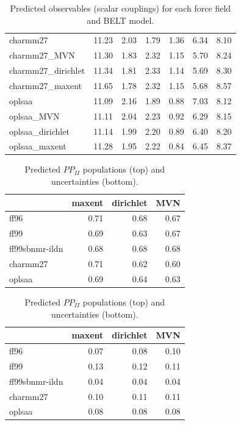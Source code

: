 \documentclass[12pt]{article}
\begin{document}
\begin{table}
\begin{tabular}{lrrrrrr}
\toprule
charmm27                    &    11.23 &          2.03 &      1.79 &          1.36 &      6.34 &     8.10 \\
charmm27\_MVN                &    11.30 &          1.83 &      2.32 &          1.15 &      5.70 &     8.24 \\
charmm27\_dirichlet          &    11.34 &          1.81 &      2.33 &          1.14 &      5.69 &     8.30 \\
charmm27\_maxent             &    11.65 &          1.78 &      2.32 &          1.15 &      5.68 &     8.57 \\
\toprule
oplsaa                      &    11.09 &          2.16 &      1.89 &          0.88 &      7.03 &     8.12 \\
oplsaa\_MVN                  &    11.11 &          2.04 &      2.23 &          0.92 &      6.29 &     8.15 \\
oplsaa\_dirichlet            &    11.14 &          1.99 &      2.20 &          0.89 &      6.40 &     8.20 \\
oplsaa\_maxent               &    11.28 &          1.95 &      2.22 &          0.84 &      6.45 &     8.37 \\
\bottomrule

\end{tabular}
\caption{
Predicted observables (scalar couplings) for each force field and BELT model.  
}
\end{table}



\clearpage

\begin{table}

\begin{tabular}{lrrr}
\toprule
{} &  maxent &  dirichlet &  MVN \\
\midrule
ff96           &    0.71 &       0.68 & 0.67 \\
ff99           &    0.69 &       0.63 & 0.67 \\
ff99sbnmr-ildn &    0.68 &       0.68 & 0.68 \\
charmm27          &    0.71 &       0.62 & 0.60 \\
oplsaa            &    0.69 &       0.64 & 0.63 \\
\bottomrule
\end{tabular}


\begin{tabular}{lrrr}
\toprule
{} &  maxent &  dirichlet &  MVN \\
\midrule
ff96           &    0.07 &       0.08 & 0.10 \\
ff99           &    0.13 &       0.12 & 0.11 \\
ff99sbnmr-ildn &    0.04 &       0.04 & 0.04 \\
charmm27          &    0.10 &       0.11 & 0.11 \\
oplsaa            &    0.08 &       0.08 & 0.08 \\
\bottomrule
\end{tabular}

\caption{
Predicted $PP_{II}$ populations (top) and uncertainties (bottom).  
}
\end{table}
\end{document}
